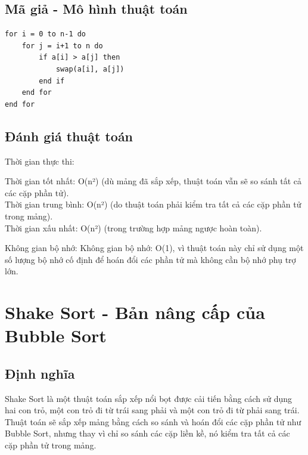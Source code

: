 \documentclass[12pt,a4paper]{report}
\begin{document}
\subsection{ Mã giả - Mô hình thuật toán}

\begin{lstlisting}
for i = 0 to n-1 do
    for j = i+1 to n do
        if a[i] > a[j] then
            swap(a[i], a[j])
        end if
    end for
end for
\end{lstlisting}

\subsection{ Đánh giá thuật toán}

{Thời gian thực thi:

\hspace{0.5cm} Thời gian tốt nhất: O(n²) (dù mảng đã sắp xếp, thuật toán vẫn sẽ so sánh tất cả các cặp phần tử).\\

\hspace{0.5cm} Thời gian trung bình: O(n²) (do thuật toán phải kiểm tra tất cả các cặp phần tử trong mảng).\\

\hspace{0.5cm} Thời gian xấu nhất: O(n²) (trong trường hợp mảng ngược hoàn toàn).\\}

{Không gian bộ nhớ: Không gian bộ nhớ: O(1), vì thuật toán này chỉ sử dụng một số lượng bộ nhớ cố định để hoán đổi các phần tử mà không cần bộ nhớ phụ trợ lớn.}

\section{ Shake Sort - Bản nâng cấp của Bubble Sort}
 
\subsection{ Định nghĩa}

{\large \hspace{1cm} Shake Sort là một thuật toán sắp xếp nổi bọt được cải tiến bằng cách sử dụng hai con trỏ, một con trỏ đi từ trái sang phải và một con trỏ đi từ phải sang trái. Thuật toán sẽ sắp xếp mảng bằng cách so sánh và hoán đổi các cặp phần tử như Bubble Sort, nhưng thay vì chỉ so sánh các cặp liền kề, nó kiểm tra tất cả các cặp phần tử trong mảng.}
\end{document}
